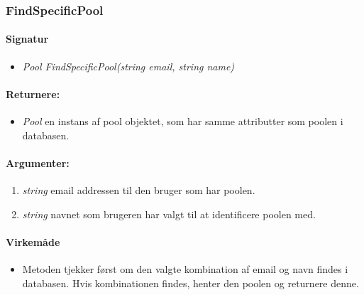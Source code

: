\subsubsection{FindSpecificPool}%





\paragraph{Signatur}
\begin{itemize}
	\item \textit{Pool FindSpecificPool(string email, string name)}
\end{itemize}

\paragraph{Returnere:}
\begin{itemize}
	\item \textit{Pool} en instans af pool objektet, som har samme attributter som poolen i databasen.
\end{itemize}

\paragraph{Argumenter:}
\begin{enumerate}
	\item \textit{string} email addressen til den bruger som har poolen.
	\item \textit{string} navnet som brugeren har valgt til at identificere poolen med.
\end{enumerate}

\paragraph{Virkemåde}
\begin{itemize}
	\item Metoden tjekker først om den valgte kombination af email og navn findes i databasen. Hvis kombinationen findes, henter den poolen og returnere denne.
\end{itemize}

